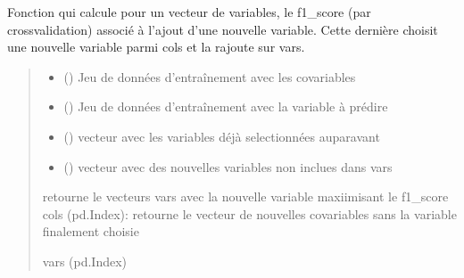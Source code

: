 \documentclass[letterpaper,10pt,french]{sphinxmanual}
\begin{document}
\begin{fulllineitems}
\label{\detokenize{KNN_sel_var:KNN_sel_var.choix_var_knn}}
\pysigstartsignatures
{}
\pysigstopsignatures
\sphinxAtStartPar
Fonction qui calcule pour un vecteur de variables, le f1\_score (par cross\sphinxhyphen{}validation) associé à l’ajout d’une nouvelle variable.
Cette dernière choisit une nouvelle variable parmi cols et la rajoute sur vars.
\begin{quote}\begin{description}
\begin{itemize}
\item {} 
\sphinxAtStartPar
{} () \textendash{} Jeu de données d’entraînement avec les co\sphinxhyphen{}variables

\item {} 
\sphinxAtStartPar
{} () \textendash{} Jeu de données d’entraînement avec la variable à prédire

\item {} 
\sphinxAtStartPar
{} () \textendash{} vecteur avec les variables déjà selectionnées auparavant

\item {} 
\sphinxAtStartPar
{} () \textendash{} vecteur avec des nouvelles variables non inclues dans vars

\end{itemize}

\sphinxAtStartPar
retourne le vecteurs vars avec la nouvelle variable maxiimisant le f1\_score
cols (pd.Index): retourne le vecteur de nouvelles co\sphinxhyphen{}variables sans la variable finalement choisie

\sphinxAtStartPar
vars (pd.Index)

\end{description}\end{quote}

\end{fulllineitems}
\end{document}

